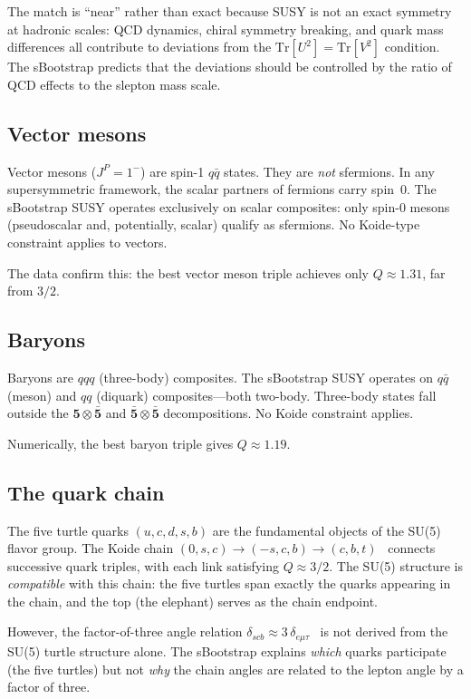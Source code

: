 \documentclass[prd,twocolumn,superscriptaddress,nofootinbib]{revtex4-2}
\newcommand{\Tr}{\mathrm{Tr}}
\begin{document}
The match is ``near'' rather than exact because
SUSY is not an exact symmetry at hadronic scales: QCD dynamics, chiral
symmetry breaking, and quark mass differences all contribute to
deviations from the $\Tr[U^2]=\Tr[V^2]$ condition.  The sBootstrap
predicts that the deviations should be controlled by the ratio of
QCD effects to the slepton mass scale.

\subsection{Vector mesons}
\label{sec:vectors}

Vector mesons ($J^P=1^-$) are spin-1 $q\bar{q}$ states.  They are
\emph{not} sfermions.  In any supersymmetric framework, the scalar
partners of fermions carry spin~0.  The sBootstrap SUSY operates
exclusively on scalar composites: only spin-0 mesons (pseudoscalar and,
potentially, scalar) qualify as sfermions.  No Koide-type constraint
applies to vectors.

The data confirm this: the best vector meson triple achieves only
$Q\approx 1.31$, far from $3/2$.

\subsection{Baryons}
\label{sec:baryons}

Baryons are $qqq$ (three-body) composites.  The sBootstrap SUSY
operates on $q\bar{q}$ (meson) and $qq$ (diquark) composites---both
two-body.  Three-body states fall outside the
$\mathbf{5}\otimes\bar{\mathbf{5}}$ and
$\bar{\mathbf{5}}\otimes\bar{\mathbf{5}}$ decompositions.  No Koide
constraint applies.

Numerically, the best baryon triple gives $Q\approx 1.19$.

\subsection{The quark chain}
\label{sec:chain}

The five turtle quarks $(u,c,d,s,b)$ are the fundamental objects of the
SU(5) flavor group.  The Koide chain
$(0,s,c)\to(-s,c,b)\to(c,b,t)$~\cite{Rivero2013chain} connects
successive quark triples, with each link satisfying $Q\approx 3/2$.
The SU(5) structure is \emph{compatible} with this chain: the five
turtles span exactly the quarks appearing in the chain, and the top
(the elephant) serves as the chain endpoint.

However, the factor-of-three angle relation
$\delta_{scb}\approx 3\,\delta_{e\mu\tau}$~\cite{Zenczykowski2012,
Rivero2013chain} is not derived from the SU(5) turtle structure alone.
The sBootstrap explains \emph{which} quarks participate (the five
turtles) but not \emph{why} the chain angles are related to the lepton
angle by a factor of three.
\end{document}

